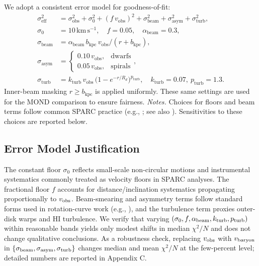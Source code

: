 \documentclass[usenatbib]{mnras}
\begin{document}
We adopt a consistent error model for goodness-of-fit:
\begin{align}
\sigma_\mathrm{eff}^2 &= \sigma_\mathrm{obs}^2 + \sigma_0^2 + (f\,v_\mathrm{obs})^2 + \sigma_\mathrm{beam}^2 + \sigma_\mathrm{asym}^2 + \sigma_\mathrm{turb}^2,\\
\sigma_0 &= 10\,\mathrm{km\,s^{-1}},\quad f = 0.05,\quad \alpha_\mathrm{beam}=0.3,\\
\sigma_\mathrm{beam} &= \alpha_\mathrm{beam}\, b_\mathrm{kpc}\, v_\mathrm{obs}/(r+b_\mathrm{kpc}),\\
\sigma_\mathrm{asym} &= \begin{cases}0.10\,v_\mathrm{obs}, & \text{dwarfs}\\ 0.05\,v_\mathrm{obs}, & \text{spirals}\end{cases},\\
\sigma_\mathrm{turb} &= k_\mathrm{turb}\, v_\mathrm{obs}\,\big(1-e^{-r/R_d}\big)^{p_\mathrm{turb}},\quad k_\mathrm{turb}=0.07,\ p_\mathrm{turb}=1.3.
\end{align}
Inner-beam masking $r\ge b_\mathrm{kpc}$ is applied uniformly. These same settings are used for the MOND comparison to ensure fairness.
\noindent\textit{Notes.} Choices for floors and beam terms follow common SPARC practice (e.g., \citealp{lelli2016sparc}; see also \citealp{mcgaugh2016}). Sensitivities to these choices are reported below.

\subsection{Error Model Justification}
\noindent The constant floor $\sigma_0$ reflects small-scale non-circular motions and instrumental systematics commonly treated as velocity floors in SPARC analyses. The fractional floor $f$ accounts for distance/inclination systematics propagating proportionally to $v_{\rm obs}$. Beam-smearing and asymmetry terms follow standard forms used in rotation-curve work (e.g., \citealp{lelli2016sparc,mcgaugh2016}), and the turbulence term proxies outer-disk warps and HI turbulence. We verify that varying $(\sigma_0,f,\alpha_{\rm beam},k_{\rm turb},p_{\rm turb})$ within reasonable bands yields only modest shifts in median $\chi^2/N$ and does not change qualitative conclusions. As a robustness check, replacing $v_{\rm obs}$ with $v_{\rm baryon}$ in $\{\sigma_{\rm beam},\sigma_{\rm asym},\sigma_{\rm turb}\}$ changes median and mean $\chi^2/N$ at the few-percent level; detailed numbers are reported in Appendix C.
\end{document}
